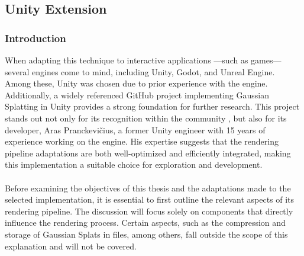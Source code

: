 \documentclass[12pt]{article}
\begin{document}
\subsection{Unity Extension}
\label{sec:pipeline_overview}
\subsubsection{Introduction}
When adapting this technique to interactive applications —such as games—several engines come to mind, including Unity, Godot, and Unreal Engine. Among these, Unity was chosen due to prior experience with the engine. Additionally, a widely referenced GitHub project \parencite{Aras} implementing Gaussian Splatting in Unity provides a strong foundation for further research. This project stands out not only for its recognition within the community \parencite{ArasRecc1,ArasRecc2}, but also for its developer, Aras Pranckevičius, a former Unity engineer with 15 years of experience working on the engine. His expertise suggests that the rendering pipeline adaptations are both well-optimized and efficiently integrated, making this implementation a suitable choice for exploration and development.
\\\\
Before examining the objectives of this thesis and the adaptations made to the selected implementation, it is essential to first outline the relevant aspects of its rendering pipeline. The discussion will focus solely on components that directly influence the rendering process. Certain aspects, such as the compression and storage of Gaussian Splats in files, among others, fall outside the scope of this explanation and will not be covered.
\end{document}
